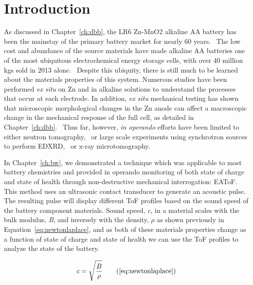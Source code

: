 \section{Introduction}
\label{sec:alkbw:intro}

As discussed in Chapter~\ref{ch:dbb}, the LR6 Zn-MnO2 alkaline AA battery has been the mainstay of the primary battery market for nearly 60 years.~\cite{karl_patent} The low cost and abundance of the source materials have made alkaline AA batteries one of the most ubiquitous electrochemical energy storage cells, with over 40 million kgs sold in 2013 alone.~\cite{highbeam,ibisworld} Despite this ubiquity, there is still much to be learned about the materials properties of this system. Numerous studies have been performed \textit{ex situ} on Zn and  in alkaline solutions to understand the processes that occur at each electrode.\cite{arise,Balachandran2002-vd,Chen1993-bw,Chin1982-lw,Kozawa1966-ga,Kozawa1965-yt,Liu1981-ub,McLarnon1991-bw,Pandya1995-tg} In addition, \textit{ex situ} mechanical testing has shown that microscopic morphological changes in the Zn anode can affect a macroscopic change in the mechanical response of the full cell, as detailed in Chapter~\ref{ch:dbb}.~\cite{Bhadra2015-aq} Thus far, however, \textit{in operando} efforts have been limited to either neutron tomography,~\cite{Manke2007-yj,Riley2010-ur} or large scale experiments using synchrotron sources to perform EDXRD,~\cite{gallaway,Gallaway2015-xy} or x-ray microtomography.~\cite{haibel, Manke2007-yj}

In Chapter~\ref{ch:bw}, we demonstrated a technique which was applicable to most battery chemistries and provided in operando monitoring of both state of charge and state of health through non-destructive mechanical interrogation: EAToF.~\cite{Hsieh2015-kr} This method uses an ultrasonic contact transducer to generate an acoustic pulse. The resulting pulse will display different ToF profiles based on the sound speed of the battery component materials. Sound speed, \emph{c}, in a material scales with the bulk modulus, \emph{B}, and inversely with the density, \emph{$\rho$} as shown previously in Equation~\ref{eq:newtonlaplace}, and as both of these materials properties change as a function of state of charge and state of health we can use the ToF profiles to analyze the state of the battery.

\begin{equation*}
c= \sqrt{\frac{B}{\rho}}
\tag{\ref{eq:newtonlaplace}}
\end{equation*}

